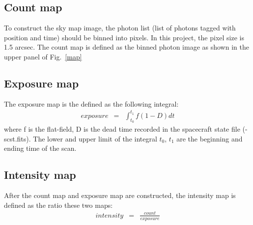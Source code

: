 \documentclass[12pt, preprint]{aastex}
\begin{document}
\subsection{Count map}
To construct the sky map image, the photon list (list of photons tagged with position and time) should be binned into pixels. In this project, the pixel size is 1.5 arcsec. The count map is defined as the binned photon image as shown in the upper panel of Fig.~\ref{map}
 
\subsection{Exposure map}
The exposure map is the defined as the following integral:
\begin{eqnarray}
  exposure &=& \int_{t_0}^{t_1}f(1-D)dt
\end{eqnarray}
where f is the flat-field, D is the dead time recorded in the spacecraft state file (-scst.fits). The lower and upper limit of the integral $t_0$, $t_1$ are the beginning and ending time of the scan.

\subsection{Intensity map}
After the count map and exposure map are constructed, the intensity map is defined as the ratio these two maps:
\begin{eqnarray}
  intensity &=& \frac{count}{exposure}
\end{eqnarray}
\end{document}
